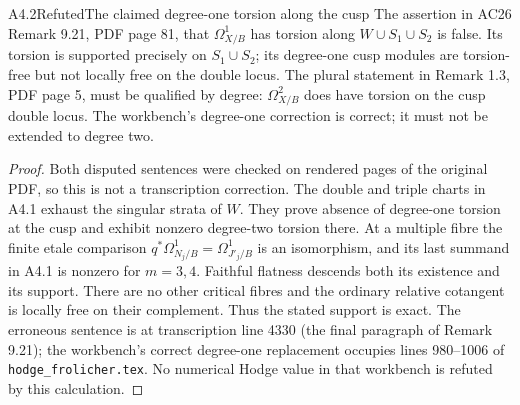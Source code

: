 \begin{claim}{A4.2}{Refuted}{The claimed degree-one torsion along the cusp}
The assertion in AC26 Remark 9.21, PDF page 81, that
$\Omega_{X/B}^1$ has torsion along $W\cup S_1\cup S_2$ is false.
Its torsion is supported precisely on $S_1\cup S_2$; its degree-one
cusp modules are torsion-free but not locally free on the double
locus.  The plural statement in Remark 1.3, PDF page 5, must be
qualified by degree: $\Omega^2_{X/B}$ does have torsion on the cusp
double locus.  The workbench's degree-one correction is correct;
it must not be extended to degree two.
\end{claim}
\begin{proof}
Both disputed sentences were checked on rendered pages of the
original PDF, so this is not a transcription correction.  The
double and triple charts in A4.1 exhaust the singular strata of
$W$.  They prove absence of degree-one torsion at the cusp and
exhibit nonzero degree-two torsion there.  At a multiple fibre the
finite etale comparison
$q^*\Omega^1_{N_j/B}=\Omega^1_{J'_j/B}$ is an isomorphism,
and its last summand in A4.1 is nonzero for $m=3,4$.
Faithful flatness descends both its existence and its support.
There are no other critical fibres and the ordinary relative
cotangent is locally free on their complement.  Thus the stated
support is exact.  The erroneous sentence is at transcription
line 4330 (the final paragraph of Remark 9.21); the workbench's
correct degree-one replacement occupies lines 980--1006 of
\texttt{hodge\_frolicher.tex}.  No numerical Hodge value in that
workbench is refuted by this calculation.
\end{proof}

